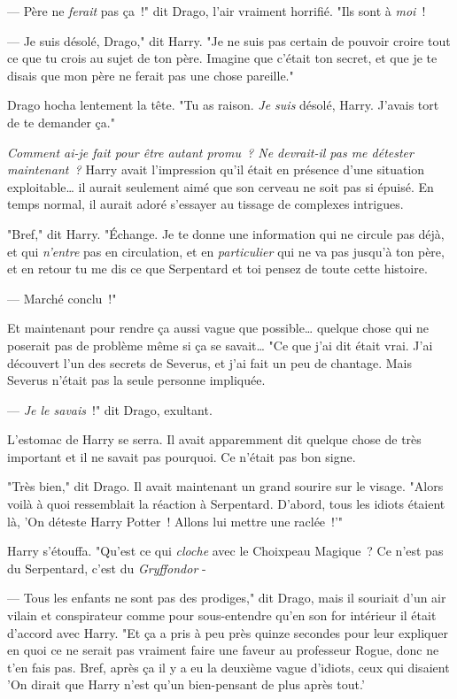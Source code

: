 --- Père ne \emph{ferait} pas ça~!" dit Drago, l'air vraiment horrifié. "Ils sont à \emph{moi}~!

--- Je suis désolé, Drago," dit Harry. "Je ne suis pas certain de pouvoir croire tout ce que tu crois au sujet de ton père. Imagine que c'était ton secret, et que je te disais que mon père ne ferait pas une chose pareille."

Drago hocha lentement la tête. "Tu as raison. \emph{Je suis} désolé, Harry. J'avais tort de te demander ça."

\emph{Comment ai-je fait pour être autant promu~? Ne devrait-il pas me détester maintenant~?} Harry avait l'impression qu'il était en présence d'une situation exploitable… il aurait seulement aimé que son cerveau ne soit pas si épuisé. En temps normal, il aurait adoré s'essayer au tissage de complexes intrigues.

"Bref," dit Harry. "Échange. Je te donne une information qui ne circule pas déjà, et qui \emph{n'entre} pas en circulation, et en \emph{particulier} qui ne va pas jusqu'à ton père, et en retour tu me dis ce que Serpentard et toi pensez de toute cette histoire.

--- Marché conclu~!"

Et maintenant pour rendre ça aussi vague que possible… quelque chose qui ne poserait pas de problème même si ça se savait… "Ce que j'ai dit était vrai. J'ai découvert l'un des secrets de Severus, et j'ai fait un peu de chantage. Mais Severus n'était pas la seule personne impliquée.

--- \emph{Je le savais}~!" dit Drago, exultant.

L'estomac de Harry se serra. Il avait apparemment dit quelque chose de très important et il ne savait pas pourquoi. Ce n'était pas bon signe.

"Très bien," dit Drago. Il avait maintenant un grand sourire sur le visage. "Alors voilà à quoi ressemblait la réaction à Serpentard. D'abord, tous les idiots étaient là, 'On déteste Harry Potter~! Allons lui mettre une raclée~!'"

Harry s'étouffa. "Qu'est ce qui \emph{cloche} avec le Choixpeau Magique~? Ce n'est pas du Serpentard, c'est du \emph{Gryffondor} -

--- Tous les enfants ne sont pas des prodiges," dit Drago, mais il souriait d'un air vilain et conspirateur comme pour sous-entendre qu'en son for intérieur il était d'accord avec Harry. "Et ça a pris à peu près quinze secondes pour leur expliquer en quoi ce ne serait pas vraiment faire une faveur au professeur Rogue, donc ne t'en fais pas. Bref, après ça il y a eu la deuxième vague d'idiots, ceux qui disaient 'On dirait que Harry n'est qu'un bien-pensant de plus après tout.'

